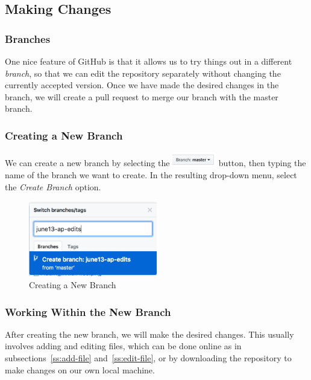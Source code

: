 \documentclass[11pt]{article}
\begin{document}
\subsection{Making Changes}

\hypertarget{branch-section}{\subsubsection{Branches}}

One nice feature of GitHub is that it allows us to try things out in a different \textit{branch}, so that we can edit the repository separately without changing the currently accepted version. Once we have made the desired changes in the branch, we will create a pull request to merge our branch with the master branch. 

\subsubsection{Creating a New Branch}

We can create a new branch by selecting the \includegraphics[width=0.75in]{master-branch} button, then typing the name of the branch we want to create. In the resulting drop-down menu, select the \textit{Create Branch} option. 

\begin{figure}[h!]\label{f:create-branch}
\centering
\includegraphics[width=0.5\textwidth]{creating-branch}
\caption{Creating a New Branch}
\end{figure}

\subsubsection{Working Within the New Branch}

After creating the new branch, we will make the desired changes. This usually involves adding and editing files, which can be done online as in subsections~\ref{ss:add-file} and~\ref{ss:edit-file}, or by downloading the repository to make changes on our own local machine. 
\end{document}
